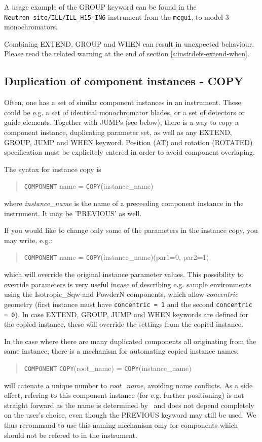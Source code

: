 A usage example of the GROUP keyword can be found in the \\
\verb+Neutron site/ILL/ILL_H15_IN6+ instrument from the \verb+mcgui+, to model 3 monochromators.

Combining EXTEND, GROUP and WHEN can result in unexpected behaviour. Please read the related warning at the end of section \ref{s:instrdefs-extend-when}.

\subsection{Duplication of component instances - COPY}
\label{s:instrdefs-extend-copy}

Often, one has a set of similar component instances in an instrument. These could be e.g. a set of identical monochromator blades, or a set of detectors or guide elements.
Together with JUMPs (see below), there is a way to copy a component instance, duplicating parameter set, as well as any EXTEND, GROUP, JUMP and WHEN keyword.
Position (AT) and rotation (ROTATED) specification must be explicitely entered in order to avoid component overlaping.

The syntax for instance copy is
\begin{quote}
  \texttt{COMPONENT} name = \texttt{COPY}(instance\_name)
\end{quote}
where {\it instance\_name} is the name of a preceeding component instance in the instrument. It may be 'PREVIOUS' as well.

If you would like to change only some of the parameters in the instance copy, you may write, e.g.:
\begin{quote}
  \texttt{COMPONENT} name = \texttt{COPY}(instance\_name)(par1=0, par2=1)
\end{quote}
which will override the original instance parameter values. This possibility to override parameters is very useful incase of describing e.g. sample environments using the Isotropic\_Sqw and PowderN components, which allow \emph{concentric} geometry (first instance must have \verb+concentric = 1+ and the second \verb+concentric = 0+). In case EXTEND, GROUP, JUMP and WHEN keywords are defined for the copied instance, these will override the settings from the copied instance.


In the case where there are many duplicated components all originating from the same instance, there is a mechanism for automating copied instance names:
\begin{quote}
  \texttt{COMPONENT} \texttt{COPY}(root\_name) = \texttt{COPY}(instance\_name)
\end{quote}
will catenate a unique number to {\it root\_name}, avoiding name
conflicts. As a side effect, refering to this component instance (for
e.g. further positioning) is not straight forward as the name is
determined by \MCS\ and does not depend completely on the user's
choice, even though the PREVIOUS keyword may still be used. We thus recommand to use this naming mechanism only for components which should not be refered to in the instrument.

